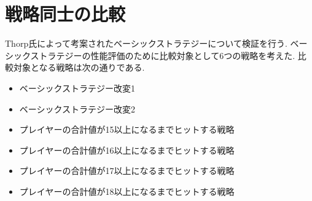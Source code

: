 





\section{戦略同士の比較}
Thorp氏によって考案されたベーシックストラテジーについて検証を行う.
ベーシックストラテジーの性能評価のために比較対象として6つの戦略を考えた.
比較対象となる戦略は次の通りである.

\begin{itemize}
  \item ベーシックストラテジー改変1
  \item ベーシックストラテジー改変2
  \item プレイヤーの合計値が15以上になるまでヒットする戦略
  \item プレイヤーの合計値が16以上になるまでヒットする戦略
  \item プレイヤーの合計値が17以上になるまでヒットする戦略
  \item プレイヤーの合計値が18以上になるまでヒットする戦略
\end{itemize}

